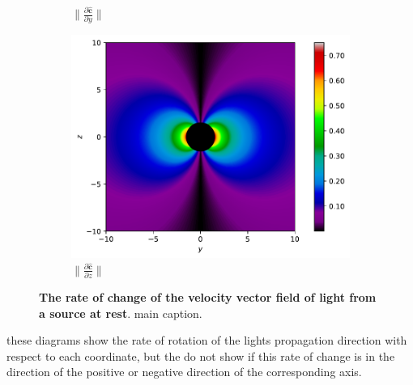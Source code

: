 \begin{figure}[H]
\begin{subfigure}{0.32\textwidth}
		\caption{$\|\frac{\partial \mathbf{\hat{c}}}{\partial y}\|$}
		\label{fig: Rate of change of lights velocity field of rest source subfig_2}
	\end{subfigure}
	\begin{subfigure}{0.32\textwidth}
		\centering
		\includegraphics[width=\textwidth]{images/pdf/Rate_of_change_of_lights_velocity_field_with_respect_to_z_u_is_0.pdf}
		\caption{$\|\frac{\partial \mathbf{\hat{c}}}{\partial z}\|$}
		\label{fig: Rate of change of lights velocity field of rest source subfig_3}
	\end{subfigure}
	\caption{\textbf{The rate of change of the velocity vector field of light from a source at rest}. main caption.}
	\label{fig: Rate of change of lights velocity field of rest source}
\end{figure}

these diagrams show the rate of rotation of the lights propagation direction with respect to each coordinate, but the do not show if this rate of change is in the direction of the positive or negative direction of the corresponding axis.

